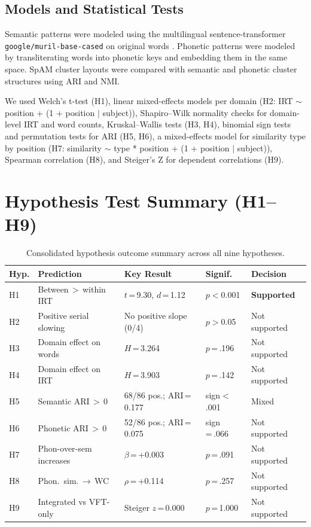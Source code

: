 \documentclass[12pt]{article}
\begin{document}
\subsection{Models and Statistical Tests}
Semantic patterns were modeled using the multilingual sentence-transformer \texttt{google/muril-base-cased} on original words \citep{kumar2022}. Phonetic patterns were modeled by transliterating words into phonetic keys and embedding them in the same space. SpAM cluster layouts were compared with semantic and phonetic cluster structures using ARI and NMI.

We used Welch's t-test (H1), linear mixed-effects models per domain (H2: IRT $\sim$ position + (1 + position $|$ subject)), Shapiro--Wilk normality checks for domain-level IRT and word counts, Kruskal--Wallis tests (H3, H4), binomial sign tests and permutation tests for ARI (H5, H6), a mixed-effects model for similarity type by position (H7: similarity $\sim$ type * position + (1 + position $|$ subject)), Spearman correlation (H8), and Steiger's Z for dependent correlations (H9).

\section{Hypothesis Test Summary (H1--H9)}
\begin{table}[htbp]
\centering\small
\caption{Consolidated hypothesis outcome summary across all nine hypotheses.}
\label{tab:summary}
\begin{tabular}{p{0.6cm}p{4.5cm}p{4cm}p{1.5cm}p{2cm}}
\toprule
Hyp. & Prediction & Key Result & Signif. & Decision \\\midrule
H1 & Between\,$>$\,within IRT & $t$\,=\,9.30, $d$\,=\,1.12 & $p<$0.001 & \textbf{Supported} \\
H2 & Positive serial slowing & No positive slope (0/4) & $p>$0.05 & Not supported \\
H3 & Domain effect on words & $H$\,=\,3.264 & $p$\,=\,.196 & Not supported \\
H4 & Domain effect on IRT & $H$\,=\,3.903 & $p$\,=\,.142 & Not supported \\
H5 & Semantic ARI\,$>$\,0 & 68/86 pos.; ARI\,=\,0.177 & sign$<$.001 & Mixed \\
H6 & Phonetic ARI\,$>$\,0 & 52/86 pos.; ARI\,=\,0.075 & sign\,=\,.066 & Not supported \\
H7 & Phon-over-sem increases & $\beta$\,=\,+0.003 & $p$\,=\,.091 & Not supported \\
H8 & Phon.\ sim.\,$\to$\,WC & $\rho$\,=\,+0.114 & $p$\,=\,.257 & Not supported \\
H9 & Integrated vs VFT-only & Steiger $z$\,=\,0.000 & $p$\,=\,1.000 & Not supported \\\bottomrule
\end{tabular}
\end{table}
\end{document}
